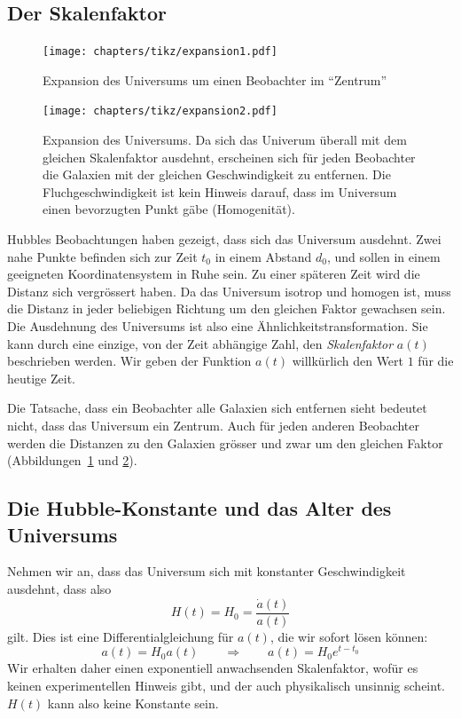 \subsection{Der Skalenfaktor}
\begin{figure}
\centering
\texttt{[image: chapters/tikz/expansion1.pdf]}
\caption{Expansion des Universums um einen Beobachter im ``Zentrum''
\label{skript:figure:expansion1}}
\end{figure}
\begin{figure}
\centering
\texttt{[image: chapters/tikz/expansion2.pdf]}
\caption{Expansion des Universums. Da sich das Univerum überall
mit dem gleichen Skalenfaktor ausdehnt, erscheinen sich für jeden
Beobachter die Galaxien mit der gleichen Geschwindigkeit zu entfernen.
Die Fluchgeschwindigkeit ist kein Hinweis darauf, dass im Universum
einen bevorzugten Punkt gäbe (Homogenität).
\label{skript:figure:expansion2}}
\end{figure}
Hubbles Beobachtungen haben gezeigt, dass sich das Universum ausdehnt.
Zwei nahe Punkte befinden sich zur Zeit $t_0$ in einem Abstand $d_0$,
und sollen in einem geeigneten Koordinatensystem in Ruhe sein.
Zu einer späteren Zeit wird die Distanz sich vergrössert haben.
Da das Universum isotrop und homogen ist, muss die Distanz in jeder
beliebigen Richtung um den gleichen Faktor gewachsen sein.
Die Ausdehnung des Universums ist also eine Ähnlichkeitstransformation.
Sie kann durch eine einzige, von der Zeit abhängige Zahl,
den {\em Skalenfaktor} $a(t)$ beschrieben werden.
Wir geben der Funktion $a(t)$ willkürlich den Wert $1$ für die heutige
Zeit.

Die Tatsache, dass ein Beobachter alle Galaxien sich entfernen
sieht bedeutet nicht, dass das Universum ein Zentrum.
Auch für jeden anderen Beobachter werden die Distanzen zu den
Galaxien grösser und zwar um den gleichen Faktor
(Abbildungen~\ref{skript:figure:expansion1} und
\ref{skript:figure:expansion2}).

\subsection{Die Hubble-Konstante und das Alter des Universums}
Nehmen wir an, dass das Universum sich mit konstanter Geschwindigkeit
ausdehnt, dass also 
\[
H(t)=H_0=\frac{\dot a(t)}{a(t)}
\]
gilt.
Dies ist eine Differentialgleichung für $a(t)$, die wir sofort
lösen können:
\[
a(t) = H_0a(t)
\qquad \Rightarrow\qquad
a(t)=H_0 e^{t-t_0}
\]
Wir erhalten daher einen exponentiell anwachsenden Skalenfaktor,
wofür es keinen experimentellen Hinweis gibt, und der auch physikalisch
unsinnig scheint.
$H(t)$ kann also keine Konstante sein.

